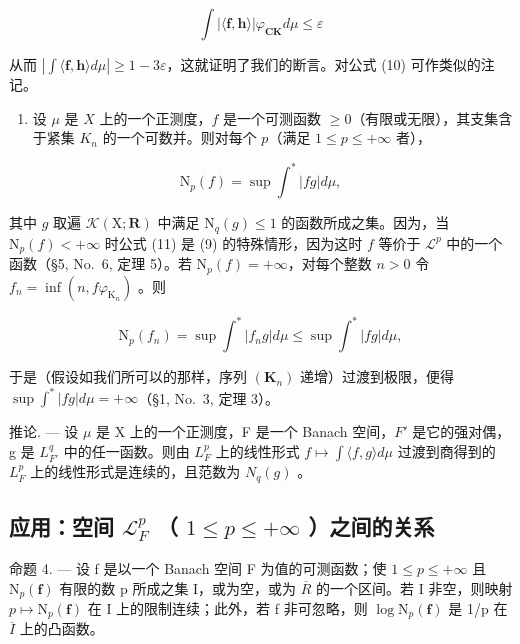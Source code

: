 \[
\int | \langle \mathbf {f}, \mathbf {h} \rangle | \varphi_ {\mathbf {C K}} d \mu \leqslant \varepsilon
\]

从而 \(|\int \langle \mathbf{f},\mathbf{h}\rangle d\mu |\geqslant 1 - 3\varepsilon\)，这就证明了我们的断言。对公式 (10) 可作类似的注记。

\begin{enumerate}
\def\labelenumi{\arabic{enumi})}
\setcounter{enumi}{1}
\tightlist
\item
  设 \(\mu\) 是 \(X\) 上的一个正测度，\(f\) 是一个可测函数 \(\geqslant 0\)（有限或无限），其支集含于紧集 \(K_{n}\) 的一个可数并。则对每个 \(p\)（满足 \(1 \leqslant p \leqslant +\infty\) 者），
\end{enumerate}

\[
\mathrm{N} _ {p} (f) = \sup \int^ {*} | f g | d \mu ,\tag{11}
\]

其中 \(g\) 取遍 \(\mathcal{K}(\mathrm{X};\mathbf{R})\) 中满足 \(\mathrm{N}_q(g)\leqslant 1\) 的函数所成之集。因为，当 \(\mathrm{N}_p(f) < +\infty\) 时公式 (11) 是 (9) 的特殊情形，因为这时 \(f\) 等价于 \(\mathcal{L}^p\) 中的一个函数（§5, No.~6, 定理 5）。若 \(\mathrm{N}_p(f) = +\infty\)，对每个整数 \(n > 0\) 令 \(f_{n} = \inf (n,f\varphi_{\mathrm{K}_{n}})\) 。则

\[
\mathrm{N} _ {p} (f _ {n}) = \sup \int^ {*} | f _ {n} g | d \mu \leqslant \sup \int^ {*} | f g | d \mu ,
\]

于是（假设如我们所可以的那样，序列 \((\mathbf{K}_n)\) 递增）过渡到极限，便得 \(\sup \int^{*}|fg| d\mu = +\infty\)（§1, No.~3, 定理 3）。

推论. --- 设 \(\mu\) 是 X 上的一个正测度，F 是一个 Banach 空间，\(F'\) 是它的强对偶，g 是 \(L_{F'}^{q}\) 中的任一函数。则由 \(L_{F}^{p}\) 上的线性形式 \(f \mapsto \int \langle f, g \rangle d\mu\) 过渡到商得到的 \(L_{F}^{p}\) 上的线性形式是连续的，且范数为 \(N_{q}(g)\) 。

\subsection{\texorpdfstring{应用：空间 \(\mathcal{L}_{F}^{p}\) （ \(1 \leqslant p \leqslant +\infty\) ）之间的关系}{应用：空间 L sub F to the p （ 1 <= p <= +infinity ）之间的关系}}

命题 4. --- 设 f 是以一个 Banach 空间 F 为值的可测函数；使 \(1 \leqslant p \leqslant +\infty\) 且 \(\mathrm{N}_{p}(\mathbf{f})\) 有限的数 p 所成之集 I，或为空，或为 \(\overline{R}\) 的一个区间。若 I 非空，则映射 \(p \mapsto \mathrm{N}_{p}(\mathbf{f})\) 在 I 上的限制连续；此外，若 f 非可忽略，则 \(\log \mathrm{N}_{p}(\mathbf{f})\) 是 1/p 在 \(\overline{I}\) 上的凸函数。

